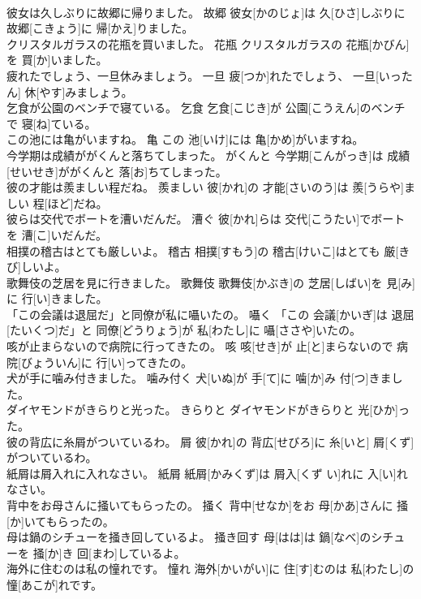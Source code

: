 \documentclass[8pt]{extreport}
\begin{document}
\begin{CJK}{UTF8}{min}
\\	彼女は久しぶりに故郷に帰りました。	故郷	彼女[かのじょ]は 久[ひさ]しぶりに 故郷[こきょう]に 帰[かえ]りました。	
\\	クリスタルガラスの花瓶を買いました。	花瓶	クリスタルガラスの 花瓶[かびん]を 買[か]いました。	
\\	疲れたでしょう、一旦休みましょう。	一旦	疲[つか]れたでしょう、 一旦[いったん] 休[やす]みましょう。	
\\	乞食が公園のベンチで寝ている。	乞食	乞食[こじき]が 公園[こうえん]のベンチで 寝[ね]ている。	
\\	この池には亀がいますね。	亀	この 池[いけ]には 亀[かめ]がいますね。	
\\	今学期は成績ががくんと落ちてしまった。	がくんと	今学期[こんがっき]は 成績[せいせき]ががくんと 落[お]ちてしまった。	
\\	彼の才能は羨ましい程だね。	羨ましい	彼[かれ]の 才能[さいのう]は 羨[うらや]ましい 程[ほど]だね。	
\\	彼らは交代でボートを漕いだんだ。	漕ぐ	彼[かれ]らは 交代[こうたい]でボートを 漕[こ]いだんだ。	
\\	相撲の稽古はとても厳しいよ。	稽古	相撲[すもう]の 稽古[けいこ]はとても 厳[きび]しいよ。	
\\	歌舞伎の芝居を見に行きました。	歌舞伎	歌舞伎[かぶき]の 芝居[しばい]を 見[み]に 行[い]きました。	
\\	「この会議は退屈だ」と同僚が私に囁いたの。	囁く	「この 会議[かいぎ]は 退屈[たいくつ]だ」と 同僚[どうりょう]が 私[わたし]に 囁[ささや]いたの。	
\\	咳が止まらないので病院に行ってきたの。	咳	咳[せき]が 止[と]まらないので 病院[びょういん]に 行[い]ってきたの。	
\\	犬が手に噛み付きました。	噛み付く	犬[いぬ]が 手[て]に 噛[か]み 付[つ]きました。	
\\	ダイヤモンドがきらりと光った。	きらりと	ダイヤモンドがきらりと 光[ひか]った。	
\\	彼の背広に糸屑がついているわ。	屑	彼[かれ]の 背広[せびろ]に 糸[いと] 屑[くず]がついているわ。	
\\	紙屑は屑入れに入れなさい。	紙屑	紙屑[かみくず]は 屑入[くず い]れに 入[い]れなさい。	
\\	背中をお母さんに掻いてもらったの。	掻く	背中[せなか]をお 母[かあ]さんに 掻[か]いてもらったの。	
\\	母は鍋のシチューを掻き回しているよ。	掻き回す	母[はは]は 鍋[なべ]のシチューを 掻[か]き 回[まわ]しているよ。	
\\	海外に住むのは私の憧れです。	憧れ	海外[かいがい]に 住[す]むのは 私[わたし]の 憧[あこが]れです。	

\end{CJK}
\end{document}
